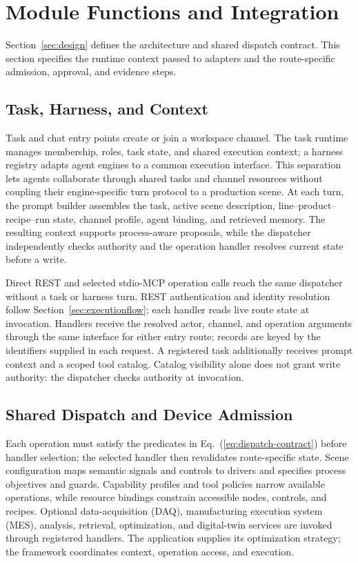 \section{Module Functions and Integration}
\label{sec:modules}
Section~\ref{sec:design} defines the architecture and shared dispatch
contract. This section specifies the runtime context passed to adapters and
the route-specific admission, approval, and evidence steps.

\subsection{Task, Harness, and Context}
Task and chat entry points create or join a workspace channel. The task
runtime manages membership, roles, task state, and shared execution context;
a harness registry adapts agent engines to a common execution interface. This
separation lets agents collaborate through shared tasks and channel resources
without coupling their engine-specific turn protocol to a production scene.
At each turn, the prompt builder assembles the task, active scene description,
line--product--recipe--run state, channel profile, agent binding, and retrieved
memory. The resulting context supports process-aware proposals, while the
dispatcher independently checks authority and the operation handler resolves
current state before a write.

Direct REST and selected stdio-MCP operation calls reach the same dispatcher
without a task or harness turn. REST authentication and identity resolution
follow Section~\ref{sec:executionflow}; each handler reads live route state
at invocation. Handlers receive the resolved actor, channel, and operation
arguments through the same interface for either entry route; records are keyed
by the identifiers supplied in each request. A registered task additionally
receives prompt context and a scoped tool catalog. Catalog visibility alone
does not grant write authority: the dispatcher checks authority at invocation.

\subsection{Shared Dispatch and Device Admission}
\label{sec:governed}
Each operation must satisfy the predicates in
Eq.~(\ref{eq:dispatch-contract}) before handler selection; the selected
handler then revalidates route-specific state. Scene configuration maps
semantic signals and controls to
drivers and specifies process objectives and guards. Capability profiles and
tool policies narrow available operations, while resource bindings constrain
accessible nodes, controls, and recipes. Optional data-acquisition (DAQ),
manufacturing execution system (MES), analysis, retrieval, optimization, and
digital-twin services are invoked through registered handlers. The application supplies its optimization strategy;
the framework coordinates context, operation access, and execution.

